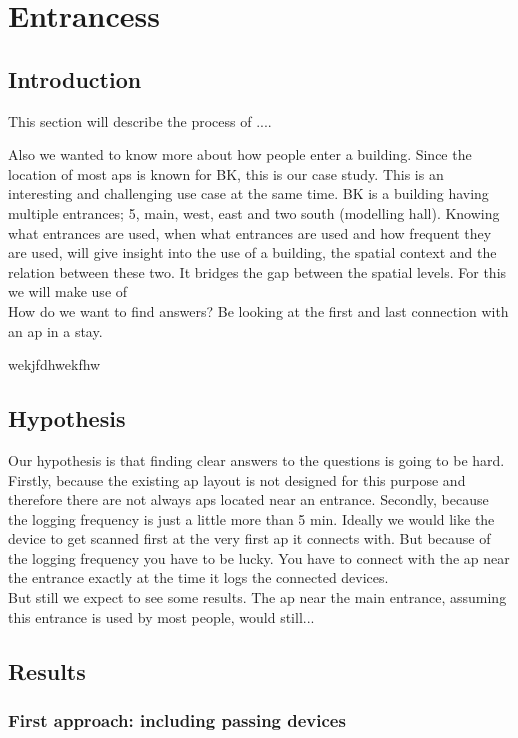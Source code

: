 \chapter{Entrancess}\label{entrances} 
\section{Introduction}\label{intro}
This section will describe the process of ....

Also we wanted to know more about how people enter a building. Since the location of most aps is known for BK, this is our case study. This is an interesting and challenging use case at the same time. BK is a building having multiple entrances; 5, main, west, east and two south (modelling hall). Knowing what entrances are used, when what entrances are used and how frequent they are used, will give insight into the use of a building, the spatial context and the relation between these two. It bridges the gap between the spatial levels. For this we will make use of  
\\
How do we want to find answers? Be looking at the first and last connection with an ap in a stay. 

wekjfdhwekfhw \\

\section{Hypothesis}\label{hypo}
Our hypothesis is that finding clear answers to the questions is going to be hard. Firstly, because the existing ap layout is not designed for this purpose and therefore there are not always aps located near an entrance. Secondly, because the logging frequency is just a little more than 5 min. Ideally we would like the device to get scanned first at the very first ap it connects with. But because  of the logging frequency you have to be lucky. You have to connect with the ap near the entrance exactly at the time it logs the connected devices. 
\\
But still we expect to see some results. The ap near the main entrance, assuming this entrance is used by most people, would still...

\section{Results}\label{results}
\subsection{First approach: including passing devices}
